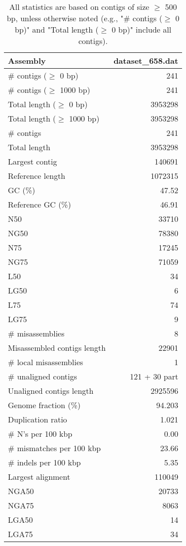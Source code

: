 \documentclass[12pt,a4paper]{article}
\begin{document}
\begin{table}[ht]
\begin{center}
\caption{All statistics are based on contigs of size $\geq$ 500 bp, unless otherwise noted (e.g., "\# contigs ($\geq$ 0 bp)" and "Total length ($\geq$ 0 bp)" include all contigs).}
\begin{tabular}{|l*{1}{|r}|}
\hline
Assembly & dataset\_658.dat \\ \hline
\# contigs ($\geq$ 0 bp) & 241 \\ \hline
\# contigs ($\geq$ 1000 bp) & 241 \\ \hline
Total length ($\geq$ 0 bp) & 3953298 \\ \hline
Total length ($\geq$ 1000 bp) & 3953298 \\ \hline
\# contigs & 241 \\ \hline
Total length & 3953298 \\ \hline
Largest contig & 140691 \\ \hline
Reference length & 1072315 \\ \hline
GC (\%) & 47.52 \\ \hline
Reference GC (\%) & 46.91 \\ \hline
N50 & 33710 \\ \hline
NG50 & 78380 \\ \hline
N75 & 17245 \\ \hline
NG75 & 71059 \\ \hline
L50 & 34 \\ \hline
LG50 & 6 \\ \hline
L75 & 74 \\ \hline
LG75 & 9 \\ \hline
\# misassemblies & 8 \\ \hline
Misassembled contigs length & 22901 \\ \hline
\# local misassemblies & 1 \\ \hline
\# unaligned contigs & 121 + 30 part \\ \hline
Unaligned contigs length & 2925596 \\ \hline
Genome fraction (\%) & 94.203 \\ \hline
Duplication ratio & 1.021 \\ \hline
\# N's per 100 kbp & 0.00 \\ \hline
\# mismatches per 100 kbp & 23.66 \\ \hline
\# indels per 100 kbp & 5.35 \\ \hline
Largest alignment & 110049 \\ \hline
NGA50 & 20733 \\ \hline
NGA75 & 8063 \\ \hline
LGA50 & 14 \\ \hline
LGA75 & 34 \\ \hline
\end{tabular}
\end{center}
\end{table}
\end{document}
